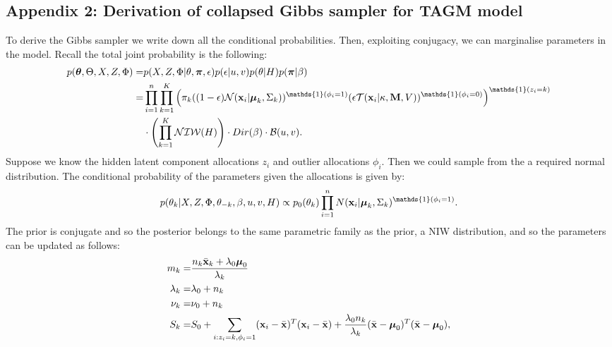 \documentclass[12pt,english]{article}
\begin{document}
\subsection{Appendix 2: Derivation of collapsed Gibbs sampler for TAGM model}\label{app::gibbs}
To derive the Gibbs sampler we write down all the conditional probabilities. Then, exploiting conjugacy, we can marginalise parameters in the model. Recall the total joint probability is the following:
\begin{equation}
\begin{split}
p(\boldsymbol{\theta},\Theta, X, Z, \Phi)  = &p(X,Z,\Phi|\theta,\boldsymbol{\pi}, \epsilon)p(\epsilon|u,v)p(\theta|H)p(\boldsymbol{\pi}|\beta)\\
=  & \prod_{i=1}^{n}\prod_{k=1}^{K}\left(\pi_k((1-\epsilon) \mathcal{N}({\bf x}_i|\boldsymbol{\mu}_k, \Sigma_k))^{\mathds{1}(\phi_i = 1)}(\epsilon \mathcal{T}({\bf x}_i|\kappa, {\bf M}, V))^{\mathds{1}(\phi_i = 0)}\right)^{\mathds{1}(z_i=k)}\\
&\cdot \left(\prod_{k=1}^{K}\mathcal{NIW}(H)\right)\cdot Dir(\beta)\cdot \mathcal{B}(u,v). \end{split}
\end{equation}
Suppose we know the hidden latent component allocations $z_i$ and outlier allocations $\phi_i$. Then we could sample from the a required normal distribution. The conditional probability of the parameters given the allocations is given by:
\begin{equation}
\begin{split}
p(\theta_k|X,Z,\Phi, \theta_{-k}, \beta, u,v, H) \propto p_0(\theta_{k})\prod_{i=1}^{n}N({\bf x}_i |\boldsymbol{\mu}_k, \Sigma_k)^{\mathds{1}(\phi_i = 1)}.
\end{split}
\end{equation}
The prior is conjugate and so the posterior belongs to the same parametric family as the prior, a NIW distribution, and so the parameters can be updated as follows:
\begin{equation}
\begin{split}
m_k = & \frac{n_k\bar{{\bf x}}_k + \lambda_0 \boldsymbol{\mu}_0}{\lambda_k}\\
\lambda_k = & \lambda_0 + n_k\\
\nu_k = & \nu_0 + n_k \\
S_k = & S_0 + \sum_{i:z_i = k, \phi_i = 1}({\bf x}_i - \bar{{\bf x}})^{T}({\bf x}_i - \bar{{\bf x}}) + \frac{\lambda_0n_k}{\lambda_k}(\bar{{\bf x}}- \boldsymbol{\mu}_0)^T(\bar{{\bf x}} - \boldsymbol{\mu}_0), \\
\end{split}
\end{equation}
\end{document}
